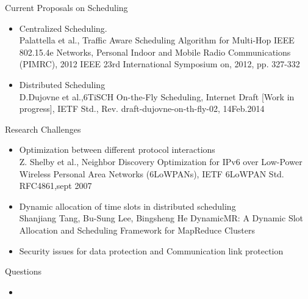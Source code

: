 \documentclass{beamer}
\begin{document}
\begin{frame}{Current Proposals on Scheduling}
\begin{itemize}
	\item{Centralized Scheduling.\\
		
			Palattella et al., Traffic Aware Scheduling Algorithm for Multi-Hop IEEE 802.15.4e Networks, Personal Indoor and Mobile Radio Communications (PIMRC), 2012 IEEE 23rd International Symposium on, 2012, pp. 327-332}
		\item {Distributed Scheduling\\
			D.Dujovne et al.,6TiSCH On-the-Fly Scheduling, Internet Draft [Work in progress], IETF Std., Rev. draft-dujovne-on-th-fly-02, 14Feb.2014\\}		
\end{itemize}
\end{frame}
\begin{frame}{Research Challenges}
	\begin{itemize}
		\item {Optimization between different protocol interactions
			\\Z. Shelby et al., Neighbor Discovery Optimization for IPv6 over Low-Power Wireless Personal Area Networks (6LoWPANs), IETF 6LoWPAN Std. RFC4861,sept 2007 }
		\item{Dynamic allocation of time slots in distributed scheduling\\
			Shanjiang Tang, Bu-Sung Lee, Bingsheng He DynamicMR: A Dynamic Slot Allocation and Scheduling Framework for MapReduce Clusters
			}
			\item{Security issues for data protection and Communication link protection}
	\end{itemize}
	
\end{frame}	
\begin{frame}{Questions}
	\begin{itemize}
		\item{}
	\end{itemize}
	
\end{frame}		
\end{document}
